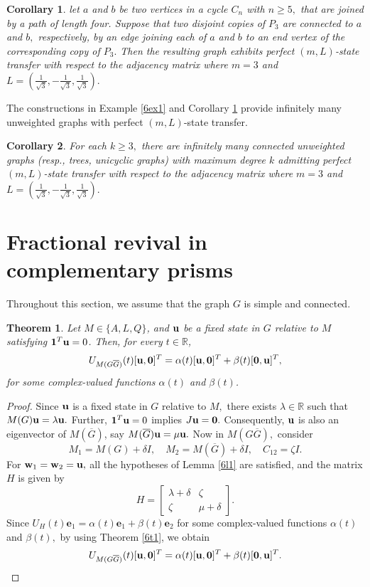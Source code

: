 \documentclass[12pt,a4paper]{article}
\newtheorem{thm}{Theorem}
\newtheorem{cor}{Corollary}
\def \e {{\bf e}}
\def \u {{\bf u}}
\def \w {{\bf w}}
\def \e {{\mathbf e}}
\newcommand{\ob}[1]{\left(#1\right)}
\begin{document}
\begin{cor}\label{6cor3}
   let $a$ and $b$ be two vertices in a cycle  $C_n$ with $n\geq5,$  that are joined by a path of length four. Suppose that two disjoint copies of $P_3$ are connected to $a$ and $b,$ respectively, by an edge joining each of $a$ and $b$ to an end vertex of the corresponding copy of $P_3.$ Then the resulting graph exhibits perfect $(m,L)$-state transfer with respect to the adjacency matrix where $m=3$ and $L=\ob{\frac{1}{\sqrt{3}},-\frac{1}{\sqrt{3}},\frac{1}{\sqrt{3}}}.$
\end{cor}
The constructions in Example \ref{6ex1} and Corollary \ref{6cor3} provide infinitely many unweighted graphs with perfect $(m,L)$-state transfer.
\begin{cor}
    For each $k\geq 3,$ there are infinitely many connected unweighted graphs (resp., trees, unicyclic graphs) with maximum degree $k$ admitting perfect $(m,L)$-state transfer with respect to the adjacency matrix where $m=3$ and $L=\ob{\frac{1}{\sqrt{3}},-\frac{1}{\sqrt{3}},\frac{1}{\sqrt{3}}}.$
\end{cor}


\section{Fractional revival in complementary prisms}\label{6s4}
Throughout this section, we assume that the graph $G$ is simple and connected.
\begin{thm}\label{6t5}
Let $M\in\{A,L,Q\}$, and
$\u$ be a fixed state in $G$ relative to $M$ satisfying
$\mathbf{1}^T\u=0$. Then, for every $t\in\mathbb{R}$,
\[
U_{M(G\overline{G})}(t)
[\u,
\mathbf{0}]^T
=
\alpha(t)[\u,
\mathbf{0}]^T+
\beta(t)
[\mathbf{0},\u]^T,
\]
for some complex-valued functions $\alpha(t)$ and $\beta(t)$.

\end{thm}

\begin{proof}
Since $\u$ is a fixed state in $G$ relative to $M,$ there exists $\lambda\in\mathbb{R}$
such that $M(G)\u=\lambda\u.$
Further, $\mathbf1^T\u=0$ implies $J\u=\mathbf{0}.$  Consequently, $\u$ is also an eigenvector of $M(\overline G)$, say
$M(\overline G)\u=\mu\u.$
Now in $M(G\overline{G}),$ consider
\[
M_1=M(G)+\delta I,\quad
M_2=M(\overline G)+\delta I,\quad C_{12}=\zeta I.\] 
For $\w_1=\w_2=\u,$ all the hypotheses of Lemma \ref{6l1} are satisfied, and the matrix $H$ is given by
\[
H=
\begin{bmatrix}
\lambda+\delta & \zeta\\
\zeta & \mu+\delta
\end{bmatrix}.
\]
Since $U_H(t)\e_1=\alpha(t)\e_1+\beta(t)\e_2$ for some complex-valued functions $\alpha(t)$ and $\beta(t),$ by using Theorem \ref{6t1}, we obtain
\[U_{M(G\overline{G})}(t)[\u,
\mathbf{0}]^T
=
\alpha(t)[\u,
\mathbf{0}]^T+
\beta(t)
[\mathbf{0},\u]^T.
\]
\end{proof}
\end{document}
